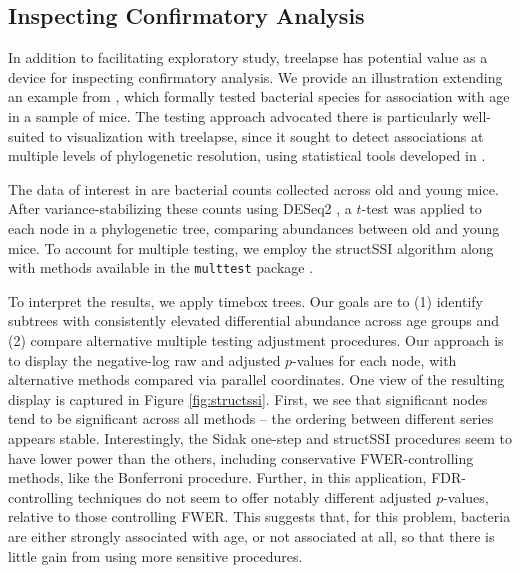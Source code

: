 \documentclass[12pt]{article}
\begin{document}
\subsection{Inspecting Confirmatory Analysis}\label{structssi}

In addition to facilitating exploratory study, treelapse has potential
value as a device for inspecting confirmatory analysis. We provide an
illustration extending an example from \citep{callahan2016bioconductor}, which
formally tested bacterial species for association with age in a sample of mice.
The testing approach advocated there is particularly well-suited to
visualization with treelapse, since it sought to detect associations at multiple
levels of phylogenetic resolution, using statistical tools developed in
\citep{yekutieli2008hierarchical, sankaran2014structssi}.

The data of interest in \citep{callahan2016bioconductor} are bacterial counts
collected across old and young mice. After variance-stabilizing these counts
using DESeq2 \citep{love2014moderated}, a $t$-test was
applied to each node in a phylogenetic tree, comparing abundances
between old and young mice. To account for multiple testing, we employ
the structSSI algorithm \citep{yekutieli2008hierarchical, sankaran2014structssi}
along with methods available in the \texttt{multtest} package
\citep{pollard2005multiple}.

To interpret the results, we apply timebox trees. Our goals are to (1)
identify subtrees with consistently elevated differential abundance
across age groups and (2) compare alternative multiple testing
adjustment procedures. Our approach is to display the negative-log raw
and adjusted $p$-values for each node, with alternative methods
compared via parallel coordinates. One view of the resulting display is
captured in Figure \ref{fig:structssi}. First, we see that significant
nodes tend to be significant across all methods -- the ordering between
different series appears stable. Interestingly, the Sidak one-step and
structSSI procedures seem to have lower power than the others, including
conservative FWER-controlling methods, like the Bonferroni procedure.
Further, in this application, FDR-controlling techniques do not seem to
offer notably different adjusted $p$-values, relative to those
controlling FWER. This suggests that, for this problem, bacteria are
either strongly associated with age, or not associated at all, so that
there is little gain from using more sensitive procedures.
\end{document}
